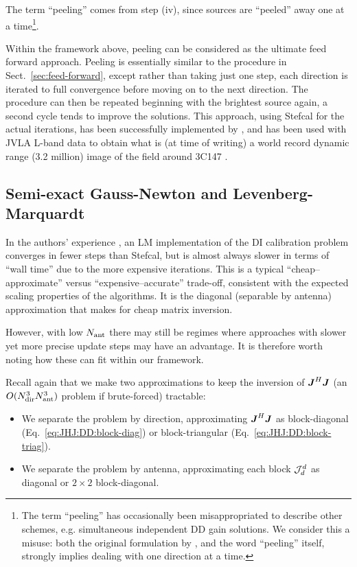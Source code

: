 \documentclass[useAMS,usenatbib]{mn2e}
\newcommand{\mat}[1]{{\bmath{#1}}}
\newcommand{\JJ}{\mat{J}} %
\newcommand{\JHJ}{\JJ^H\JJ} %
\begin{document}
The term ``peeling'' comes from step (iv), since sources are ``peeled'' away one at a time\footnote{The term ``peeling'' has 
occasionally been misappropriated to describe other schemes, e.g. simultaneous independent DD gain solutions. We consider this a 
misuse: both the original formulation by \citet{JEN:peeling}, and the word ``peeling'' itself, strongly implies dealing with 
one direction at a time.}.

Within the framework above, peeling can be considered as the ultimate feed forward approach. Peeling is essentially similar to 
the procedure in Sect.~\ref{sec:feed-forward}, except rather than taking just one step, each direction is iterated to full 
convergence before moving on to the next direction. The procedure can then be repeated beginning with the brightest source again,
a second cycle tends to improve the solutions. This approach, using Stefcal for the actual iterations, has been successfully
implemented by \citet{OMS-Stefcal}, and has been used with JVLA L-band data to obtain what is (at time of writing) a world 
record dynamic range (3.2 million) image of the field around 3C147 \citep{Perley-3C147}.

\subsection{Semi-exact Gauss-Newton and Levenberg-Marquardt}

In the authors' experience \citep{OMS-Stefcal}, an LM implementation of the DI calibration problem converges in fewer steps 
than Stefcal, but is almost always slower in terms of ``wall time'' due to the more expensive iterations. This is a 
typical ``cheap--approximate'' versus ``expensive--accurate'' trade-off, consistent with the expected scaling properties 
of the algorithms. It is the diagonal (separable by antenna) approximation that makes for cheap matrix inversion.

However, with low $N_\mathrm{ant}$ there may still be regimes where approaches with slower yet more precise update steps may have an advantage. 
It is therefore worth noting how these can fit within our framework. 

Recall again that we make two approximations to keep the inversion of $\JHJ$ (an $O(N_\mathrm{dir}^3N_\mathrm{ant}^3)$ problem if brute-forced) tractable:

\begin{itemize}
\item We separate the problem by direction, approximating $\JHJ$ as block-diagonal (Eq.~\ref{eq:JHJ:DD:block-diag}) or block-triangular
(Eq.~\ref{eq:JHJ:DD:block-triag}).
\item We separate the problem by antenna, approximating each block $\mathcal{J}^d_d$ as diagonal or $2\times2$ block-diagonal. 
\end{itemize} 
\end{document}
